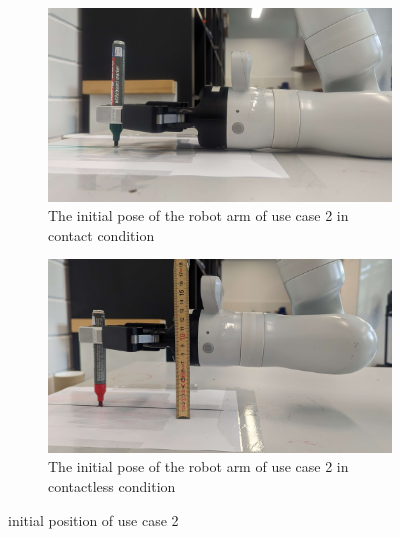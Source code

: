 \documentclass[report.tex]{subfiles}
\begin{document}
    \begin{figure}[h!]
    \captionsetup[subfigure]{justification=centering}
    \begin{subfigure}{0.5\textwidth}
            \centering
            \includegraphics[width=\linewidth]{images/us2_contact.jpg}
            \caption{The initial pose of the robot arm of use case 2 in contact condition}
            \label{fig:us2_init_con}
        \end{subfigure}
        \begin{subfigure}{0.5\textwidth}
            \centering
            \includegraphics[width=\linewidth]{images/us2_nocontact.jpg}
            \caption{The initial pose of the robot arm of use case 2 in contactless condition}
            \label{fig:us2_init_nocon}
        \end{subfigure}
        \caption{initial position of use case 2}
\end{figure}
\end{document}

